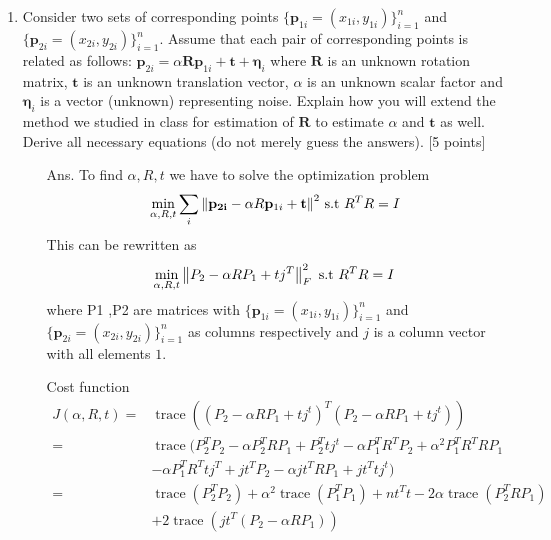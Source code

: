 \documentclass[11pt]{article}
\newcommand{\norm}[1]{\left\lVert#1\right\rVert}
\newcommand{\tr}{\operatorname{trace}}
\begin{document}
\begin{enumerate}
\item Consider two sets of corresponding points $\{\mathbf{p}_{1i} = (x_{1i},y_{1i})\}_{i=1}^{n}$ and $\{\mathbf{p}_{2i} = (x_{2i},y_{2i})\}_{i=1}^{n}$. Assume that each pair of corresponding points is related as follows: $\mathbf{p}_{2i} = \alpha \mathbf{R} \mathbf{p}_{1i} + \mathbf{t} + \mathbf{\eta}_i$ where $\mathbf{R}$ is an unknown rotation matrix, $\mathbf{t}$ is an unknown translation vector, $\alpha$ is an unknown scalar factor and $\mathbf{\eta}_i$ is a vector (unknown) representing noise. Explain how you will extend the method we studied in class for estimation of $\mathbf{R}$ to estimate $\alpha$ and $\mathbf{t}$ as well. Derive all necessary equations (do not merely guess the answers). \textsf{[5 points]}
\begin{itemize}
	\item[Ans.] To find $\alpha,R,t$ we have to solve the optimization problem 
	\[
		\min_{\alpha,R,t} \sum_i{\norm{\mathbf{{p}_{2i}} - \alpha R \mathbf{p}_{1i} + \mathbf{t}}}^2
		\textnormal{  s.t  } R^TR = I
	\]
	This can be rewritten as 
	\[
		\min_{\alpha,R,t} \norm{P_2 - \alpha R P_1 + tj^T}_F^2
		\textnormal{  s.t  } R^TR = I
	\] where P1 ,P2 are matrices with  $\{\mathbf{p}_{1i} = (x_{1i},y_{1i})\}_{i=1}^{n}$ and $\{\mathbf{p}_{2i} = (x_{2i},y_{2i})\}_{i=1}^{n}$ as columns respectively and $j$ is a column vector with all elements $1$.

	Cost function 
	\begin{align*}
	J(\alpha,R,t) =& \tr( (P_2 - \alpha R P_1 + tj^t)^T(P_2 - \alpha R P_1 + tj^t)  )\\
	=& \tr(P_2^TP_2 -\alpha P_2^T R P_1 + P_2^Ttj^t - \alpha P_1^TR^TP_2 + \alpha^2 P_1^TR^TRP_1 \\ 
	 &   - \alpha P_1^TR^T tj^T + jt^TP_2 - \alpha jt^T R P_1 + jt^Ttj^t)\\
	=& \tr(P_2^TP_2) + \alpha^2\tr(P_1^TP_1) + nt^Tt - 2 \alpha \tr(P_2^T R P_1 )\\
	 & + 2\tr(jt^T(P_2-\alpha R P_1))
	\end{align*}
	
	
\end{itemize}




\end{enumerate}
\end{document}
